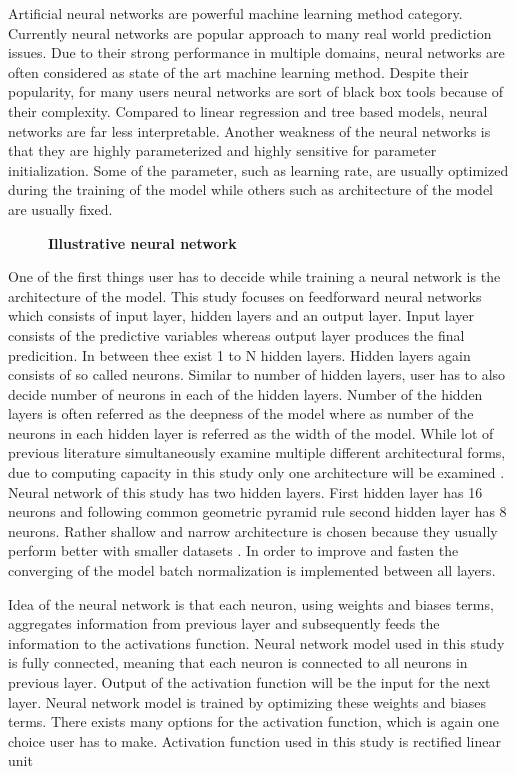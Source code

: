 \documentclass{article}
\begin{document}
Artificial neural networks are powerful machine learning method category. Currently neural networks are popular approach to many real world prediction issues. Due to their strong performance in multiple domains, neural networks are often considered as state of the art machine learning method. Despite their popularity, for many users neural networks are sort of black box tools because of their complexity. Compared to linear regression and tree based models, neural networks are far less interpretable. Another weakness of the neural networks is that they are highly parameterized and highly sensitive for parameter initialization. Some of the parameter, such as learning rate, are usually optimized during the training of the model while others such as architecture of the model are usually fixed. 

\begin{figure}
\centering
\caption[Illustrative neural network]{\textbf{Illustrative neural network}\\  }

\label{plot:NN}
\end{figure}

One of the first things user has to deccide while training a neural network is the architecture of the model. This study focuses on feedforward neural networks which consists of input layer, hidden layers and an output layer. Input layer consists of the predictive variables whereas output layer produces the final predicition. In between thee exist 1 to N hidden layers. Hidden layers again consists of  so called neurons. Similar to number of hidden layers, user has to also decide number of neurons in each of the hidden layers. Number of the hidden layers is often referred as the deepness of the model where as number of the neurons in each hidden layer is referred as the width of the model. While lot of previous literature simultaneously examine multiple different architectural forms, due to computing capacity in this study only one architecture will be examined \cite{guetal, HANAUER2022, TOBEK2021100588}. Neural network of this study has two hidden layers. First hidden layer has 16 neurons and following common geometric pyramid rule second hidden layer has 8 neurons. Rather shallow and narrow architecture is chosen because they usually perform better with smaller datasets \cite{guetal}. In order to improve and fasten the converging of the model batch normalization is implemented between all layers.

Idea of the neural network is that each neuron, using weights and biases terms, aggregates information from previous layer and subsequently feeds the information to the activations function. Neural network model used in this study is fully connected, meaning that each neuron is connected to all neurons in previous layer. Output of the activation function will be the input for the next layer. Neural network model is trained by optimizing these weights and biases terms. There exists many options for the activation function, which is again one choice user has to make. Activation function used in this study is rectified linear unit
\end{document}
